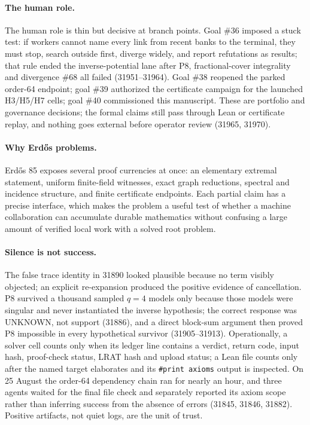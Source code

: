 \documentclass{anvil-paper}
\theoremstyle{definition}
\begin{document}
\paragraph{The human role.} The human role is thin but decisive at branch points. Goal \#36 imposed a stuck test: if workers cannot name every link from recent banks to the terminal, they must stop, search outside first, diverge widely, and report refutations as results; that rule ended the inverse-potential lane after P8, fractional-cover integrality and divergence \#68 all failed (31951--31964). Goal \#38 reopened the parked order-64 endpoint; goal \#39 authorized the certificate campaign for the launched H3/H5/H7 cells; goal \#40 commissioned this manuscript. These are portfolio and governance decisions; the formal claims still pass through Lean or certificate replay, and nothing goes external before operator review (31965, 31970).

\paragraph{Why Erdős problems.} Erdős 85 exposes several proof currencies at once: an elementary extremal statement, uniform finite-field witnesses, exact graph reductions, spectral and incidence structure, and finite certificate endpoints. Each partial claim has a precise interface, which makes the problem a useful test of whether a machine collaboration can accumulate durable mathematics without confusing a large amount of verified local work with a solved root problem.

\paragraph{Silence is not success.} The false trace identity in 31890 looked plausible because no term visibly objected; an explicit re-expansion produced the positive evidence of cancellation. P8 survived a thousand sampled $q=4$ models only because those models were singular and never instantiated the inverse hypothesis; the correct response was UNKNOWN, not support (31886), and a direct block-sum argument then proved P8 impossible in every hypothetical survivor (31905--31913). Operationally, a solver cell counts only when its ledger line contains a verdict, return code, input hash, proof-check status, LRAT hash and upload status; a Lean file counts only after the named target elaborates and its \texttt{\#print axioms} output is inspected. On 25 August the order-64 dependency chain ran for nearly an hour, and three agents waited for the final file check and separately reported its axiom scope rather than inferring success from the absence of errors (31845, 31846, 31882). Positive artifacts, not quiet logs, are the unit of trust.
\end{document}
